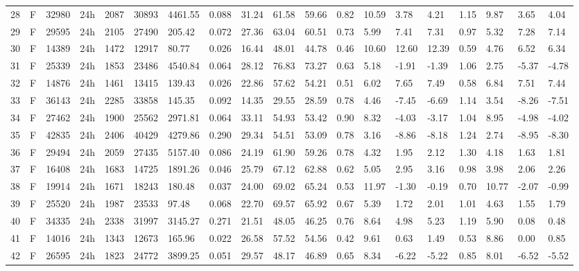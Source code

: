 \begin{tabular}{rllllllrlllllllllll}
28 & F & 32980 & 24h & 2087 & 30893 & 4461.55 & 0.088 & 31.24 & 61.58 & 59.66 & 0.82 & 10.59 & 3.78 & 4.21 & 1.15 & 9.87 & 3.65 & 4.04 \\
29 & F & 29595 & 24h & 2105 & 27490 & 205.42 & 0.072 & 27.36 & 63.04 & 60.51 & 0.73 & 5.99 & 7.41 & 7.31 & 0.97 & 5.32 & 7.28 & 7.14 \\
30 & F & 14389 & 24h & 1472 & 12917 & 80.77 & 0.026 & 16.44 & 48.01 & 44.78 & 0.46 & 10.60 & 12.60 & 12.39 & 0.59 & 4.76 & 6.52 & 6.34 \\
31 & F & 25339 & 24h & 1853 & 23486 & 4540.84 & 0.064 & 28.12 & 76.83 & 73.27 & 0.63 & 5.18 & -1.91 & -1.39 & 1.06 & 2.75 & -5.37 & -4.78 \\
32 & F & 14876 & 24h & 1461 & 13415 & 139.43 & 0.026 & 22.86 & 57.62 & 54.21 & 0.51 & 6.02 & 7.65 & 7.49 & 0.58 & 6.84 & 7.51 & 7.44 \\
33 & F & 36143 & 24h & 2285 & 33858 & 145.35 & 0.092 & 14.35 & 29.55 & 28.59 & 0.78 & 4.46 & -7.45 & -6.69 & 1.14 & 3.54 & -8.26 & -7.51 \\
34 & F & 27462 & 24h & 1900 & 25562 & 2971.81 & 0.064 & 33.11 & 54.93 & 53.42 & 0.90 & 8.32 & -4.03 & -3.17 & 1.04 & 8.95 & -4.98 & -4.02 \\
35 & F & 42835 & 24h & 2406 & 40429 & 4279.86 & 0.290 & 29.34 & 54.51 & 53.09 & 0.78 & 3.16 & -8.86 & -8.18 & 1.24 & 2.74 & -8.95 & -8.30 \\
36 & F & 29494 & 24h & 2059 & 27435 & 5157.40 & 0.086 & 24.19 & 61.90 & 59.26 & 0.78 & 4.32 & 1.95 & 2.12 & 1.30 & 4.18 & 1.63 & 1.81 \\
37 & F & 16408 & 24h & 1683 & 14725 & 1891.26 & 0.046 & 25.79 & 67.12 & 62.88 & 0.62 & 5.05 & 2.95 & 3.16 & 0.98 & 3.98 & 2.06 & 2.26 \\
38 & F & 19914 & 24h & 1671 & 18243 & 180.48 & 0.037 & 24.00 & 69.02 & 65.24 & 0.53 & 11.97 & -1.30 & -0.19 & 0.70 & 10.77 & -2.07 & -0.99 \\
39 & F & 25520 & 24h & 1987 & 23533 & 97.48 & 0.068 & 22.70 & 69.57 & 65.92 & 0.67 & 5.39 & 1.72 & 2.01 & 1.01 & 4.63 & 1.55 & 1.79 \\
40 & F & 34335 & 24h & 2338 & 31997 & 3145.27 & 0.271 & 21.51 & 48.05 & 46.25 & 0.76 & 8.64 & 4.98 & 5.23 & 1.19 & 5.90 & 0.08 & 0.48 \\
41 & F & 14016 & 24h & 1343 & 12673 & 165.96 & 0.022 & 26.58 & 57.52 & 54.56 & 0.42 & 9.61 & 0.63 & 1.49 & 0.53 & 8.86 & 0.00 & 0.85 \\
42 & F & 26595 & 24h & 1823 & 24772 & 3899.25 & 0.051 & 29.57 & 48.17 & 46.89 & 0.65 & 8.34 & -6.22 & -5.22 & 0.85 & 8.01 & -6.52 & -5.52 \\

\end{tabular}
